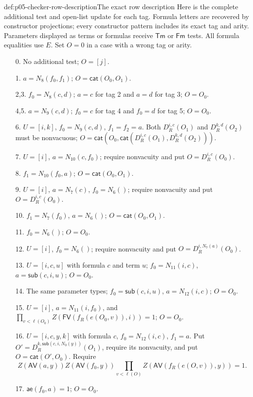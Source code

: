 \begin{hbdefinition}{def:p05-checker-row-description}{The exact row description}
Here is the complete additional test and open-list update for each tag.
Formula letters are recovered by constructor projections; every constructor
pattern includes its exact tag and arity.  Parameters displayed as terms or
formulas receive \(\mathsf{Tm}\) or \(\mathsf{Fm}\) tests.  All formula
equalities use \(E\).  Set \(O=0\) in a case with a wrong tag or arity.
\begin{enumerate}
\item[0.] No additional test; \(O=[j]\).
\item[1.] \(a=N_8(f_0,f_1)\); \(O=\mathsf{cat}(O_0,O_1)\).
\item[2,3.] \(f_0=N_8(c,d)\); \(a=c\) for tag 2 and \(a=d\)
 for tag 3; \(O=O_0\).
\item[4,5.] \(a=N_9(c,d)\); \(f_0=c\) for tag 4 and \(f_0=d\)
 for tag 5; \(O=O_0\).
\item[6.] \(U=[i,k]\), \(f_0=N_9(c,d)\), \(f_1=f_2=a\).
 Both \(D_R^{i,c}(O_1)\) and \(D_R^{k,d}(O_2)\) must be nonvacuous;
 \(O=\mathsf{cat}(O_0,\mathsf{cat}(D_R^{i,c}(O_1),D_R^{k,d}(O_2)))\).
\item[7.] \(U=[i]\), \(a=N_{10}(c,f_0)\); require nonvacuity and put
 \(O=D_R^{i,c}(O_0)\).
\item[8.] \(f_1=N_{10}(f_0,a)\);
 \(O=\mathsf{cat}(O_0,O_1)\).
\item[9.] \(U=[i]\), \(a=N_7(c)\), \(f_0=N_6()\);
 require nonvacuity and put \(O=D_R^{i,c}(O_0)\).
\item[10.] \(f_1=N_7(f_0)\), \(a=N_6()\);
 \(O=\mathsf{cat}(O_0,O_1)\).
\item[11.] \(f_0=N_6()\); \(O=O_0\).
\item[12.] \(U=[i]\), \(f_0=N_6()\); require nonvacuity and put
 \(O=D_R^{i,N_7(a)}(O_0)\).
\item[13.] \(U=[i,c,u]\) with formula \(c\) and term \(u\);
 \(f_0=N_{11}(i,c)\), \(a=\mathsf{sub}(c,i,u)\); \(O=O_0\).
\item[14.] The same parameter types; \(f_0=\mathsf{sub}(c,i,u)\),
 \(a=N_{12}(i,c)\); \(O=O_0\).
\item[15.] \(U=[i]\), \(a=N_{11}(i,f_0)\), and
 \(\prod_{v<\ell(O_0)}Z(\mathsf{FV}(f_R(e(O_0,v)),i))=1\);
 \(O=O_0\).
\item[16.] \(U=[i,c,y,k]\) with formula \(c\),
 \(f_0=N_{12}(i,c)\), \(f_1=a\).
 Put \(O'=D_R^{k,\mathsf{sub}(c,i,N_0(y))}(O_1)\), require its
 nonvacuity, and put \(O=\mathsf{cat}(O',O_0)\).  Require
 \[
 Z(\mathsf{AV}(a,y))Z(\mathsf{AV}(f_0,y))
       \prod_{v<\ell(O)}Z(\mathsf{AV}(f_R(e(O,v)),y))=1.
 \]
\item[17.] \(\mathsf{ae}(f_0,a)=1\); \(O=O_0\).

\end{enumerate}
\end{hbdefinition}
